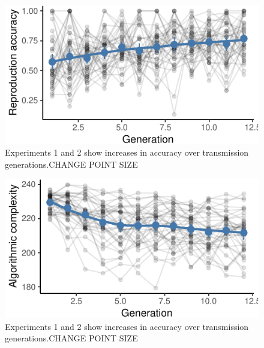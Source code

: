 \documentclass[10pt, letterpaper]{article}
\newenvironment{CodeChunk}{}{}
\begin{document}
\begin{CodeChunk}
\begin{figure}[tb]

{\centering \includegraphics{figs/e2_acc_plot-1} 

}

\caption[Experiments 1 and 2 show increases in accuracy over transmission generations.CHANGE POINT SIZE]{Experiments 1 and 2 show increases in accuracy over transmission generations.CHANGE POINT SIZE}\label{fig:e2_acc_plot}
\end{figure}
\end{CodeChunk}

\begin{CodeChunk}
\begin{figure}[tb]

{\centering \includegraphics{figs/e2_bdm_plot-1} 

}

\caption[Experiments 1 and 2 show increases in accuracy over transmission generations.CHANGE POINT SIZE]{Experiments 1 and 2 show increases in accuracy over transmission generations.CHANGE POINT SIZE}\label{fig:e2_bdm_plot}
\end{figure}
\end{CodeChunk}
\end{document}
